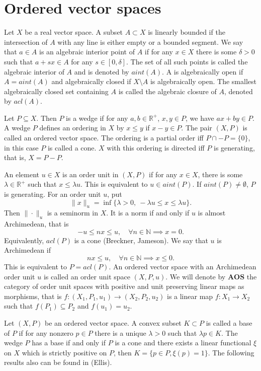 \documentclass[12pt]{article}
\newcommand{\<}{\langle}
\newcommand{\ct}[1]{\mathbf{#1}}
\begin{document}
\section{Ordered vector spaces }

Let $X$ be a real vector space. A subset $A\subset X$ is linearly bounded if the intersection of $A$ with any line is either empty or a bounded segment.
We say that $a\in A$ is an algebraic interior point of $A$ if for any $x\in X$ there is some $\delta>0$ such that $a+sx\in A$ for any $s\in [0,\delta]$. The set of all such points is called the algebraic interior of $A$ and is denoted by $aint(A)$. A is algebraically open if $A=aint(A)$ and algebraically closed if $X\setminus A$ is algebraically open. The smallest algebraically closed  set containing $A$ is called the algebraic closure of $A$, denoted by $acl(A)$. 


Let $P\subseteq X$. Then $P$ is a  wedge if for any $a,b\in \mathbb R^+$, $x,y\in P$, we have $ax+by\in P$. A wedge $P$ defines an ordering in  $X$ by $x\le y$ if $x-y\in P$. The pair $(X,P)$ is called an ordered vector space. The ordering is a partial order iff $P\cap -P=\{0\}$, in this case $P$ is called a cone. $X$ with this ordering is directed  iff $P$ is generating, that is,  $X=P-P$. 

 An element $u\in X$ is an order unit in $(X,P)$ if for any $x\in X$, there is some $\lambda\in \mathbb R^+$ such that 
 $x\le \lambda u$. This is equivalent to $u\in aint(P)$. If $aint(P)\ne \emptyset$, $P$ is generating.  For an order unit $u$, put
 \[
\|x\|_u=\inf\{\lambda>0,\ -\lambda u\le x\le \lambda u\}.
 \]
Then $\|\cdot\|_u$ is a seminorm in $X$. It is a norm if and only if  $u$ is almost Archimedean, that is
\[
-u\le nx \le u,\quad \forall n\in \mathbb N \implies x=0.
\]
Equivalently, $acl(P)$ is a cone (Breckner, Jameson). We say that $u$ is Archimedean if 
\[
nx\le u,\quad \forall n\in \mathbb N \implies x\le 0.
\]
This is equivalent to $P=acl(P)$. An ordered vector space with an Archimedean order unit $u$ is called an order unit space $(X,P,u)$.
We will denote by $\ct{AOS}$ the category of order unit spaces with positive and unit preserving linear maps as morphisms, that is $f: (X_1,P_1,u_1)\to (X_2,P_2,u_2)$ is a linear map $f:X_1\to X_2$ such that $f(P_1)\subseteq P_2$ and $f(u_1)=u_2$.

Let $(X,P)$ be an ordered vector space. A convex subset $K\subset P$ is called a base of $P$ if for any nonzero $p\in P$ there is a unique $\lambda>0$  such that 
$\lambda p\in K$.  The wedge  $P$ has a base if and only if $P$ is a cone and there exists a linear functional $\xi$ on $X$ which is strictly positive on $P$, then 
 $K=\{p\in P, \xi(p)=1\}$. The following results also can be found in (Ellis). 
\end{document}
